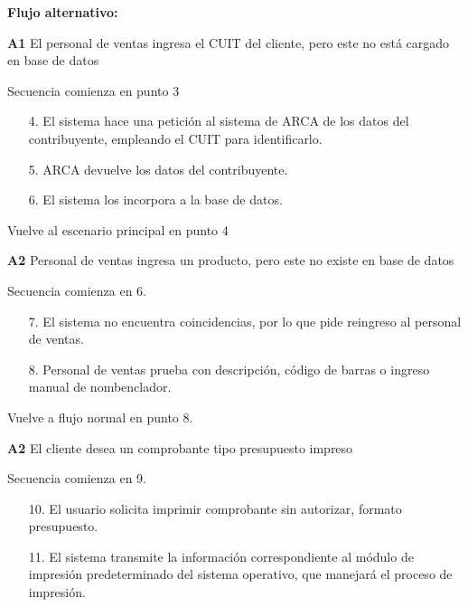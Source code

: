 \textbf{Flujo alternativo:}

\textbf{A1} El personal de ventas ingresa el CUIT del cliente, pero este no está cargado en base de datos

Secuencia comienza en punto 3

\begin{enumerate}
	\item[4.] El sistema hace una petición al sistema de ARCA de los datos del contribuyente, 
	empleando el CUIT para identificarlo.
	\item[5.] ARCA devuelve los datos del contribuyente.
	\item[6.] El sistema los incorpora a la base de datos.
\end{enumerate}

Vuelve al escenario principal en punto 4

\textbf{A2} Personal de ventas ingresa un producto, pero este no existe en base de datos

Secuencia comienza en 6.

\begin{enumerate}
	\item[7.] El sistema no encuentra coincidencias, por lo que pide reingreso al personal de ventas.
	\item[8.] Personal de ventas prueba con descripción, código de barras o ingreso manual de nombenclador.
\end{enumerate}

Vuelve a flujo normal en punto 8.

\textbf{A2} El cliente desea un comprobante tipo presupuesto impreso

Secuencia comienza en 9.

\begin{enumerate}
	\item[10.] El usuario solicita imprimir comprobante sin autorizar, formato presupuesto.
	\item[11.] El sistema transmite la información correspondiente al módulo de impresión predeterminado del sistema operativo,
	que manejará el proceso de impresión.
\end{enumerate}

\pagebreak

